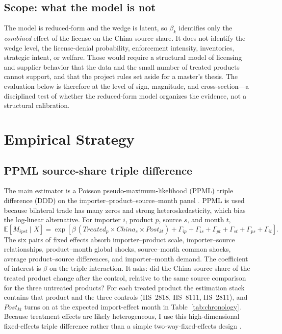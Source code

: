 \documentclass[12pt,a4paper]{article}
\begin{document}
\subsection{Scope: what the model is not}\label{sec:scope}

The model is reduced-form and the wedge is latent, so $\beta_k$ identifies only
the \emph{combined} effect of the license on the China-source share. It does not
identify the wedge level, the license-denial probability, enforcement intensity,
inventories, strategic intent, or welfare. Those would require a structural model
of licensing and supplier behavior that the data and the small number of treated
products cannot support, and that the project rules set aside for a master's
thesis. The evaluation below is therefore at the level of sign, magnitude, and
cross-section---a disciplined test of whether the reduced-form model organizes
the evidence, not a structural calibration.

\section{Empirical Strategy}\label{sec:strategy}

\subsection{PPML source-share triple difference}\label{sec:ddd}

The main estimator is a Poisson pseudo-maximum-likelihood (PPML) triple
difference (DDD) on the importer--product--source--month panel
\citep{santossilva2006gravity}. PPML is used because bilateral trade has many
zeros and strong heteroskedasticity, which bias the log-linear alternative. For
importer $i$, product $p$, source $s$, and month $t$,
\begin{equation}
\mathbb{E}[M_{ipst}\mid X]=
\exp\!\left[\beta\,(\mathit{Treated}_{p}\times \mathit{China}_{s}\times \mathit{Post}_{kt})
+\Gamma_{ip}+\Gamma_{is}+\Gamma_{pt}+\Gamma_{st}+\Gamma_{ps}+\Gamma_{it}\right].
\label{eq:ppml}
\end{equation}
The six pairs of fixed effects absorb importer--product scale, importer--source
relationships, product--month global shocks, source--month common shocks, average
product--source differences, and importer--month demand. The coefficient of
interest is $\beta$ on the triple interaction. It asks: did the China-source
share of the treated product change after the control, relative to the same
source comparison for the three untreated products? For each treated product the
estimation stack contains that product and the three controls (HS~2818, HS~8111,
HS~2811), and $\mathit{Post}_{kt}$ turns on at the expected import-effect month
in Table~\ref{tab:chronology}. Because treatment effects are likely
heterogeneous, I use this high-dimensional fixed-effects triple difference
rather than a simple two-way-fixed-effects design
\citep{dechaisemartindhaultfoeuille-2020-twowayfixedeffects}.
\end{document}
